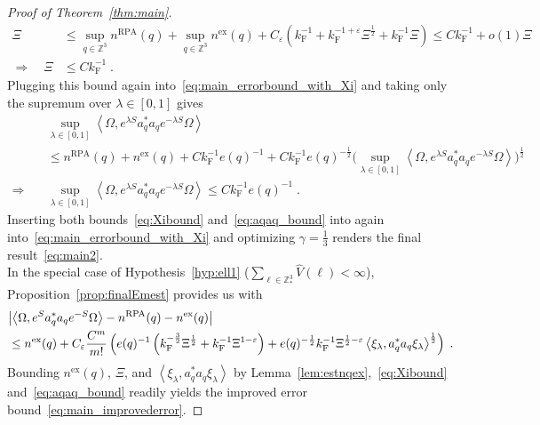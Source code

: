 \documentclass[12pt,a4paper]{article}
\numberwithin{equation}{section}
\newcommand{\1}{\mathbb{I}}
\newcommand{\ex}{\mathrm{ex}}
\newcommand{\F}{\mathrm{F}}
\newcommand{\RPA}{\mathrm{RPA}}
\newcommand{\Z}{\mathbb{Z}}
\newcommand{\half}{\frac{1}{2}}
\newcommand{\eva}[1]{\left\langle #1 \right\rangle}
\theoremstyle{plain}
\theoremstyle{definition}
\theoremstyle{remark}
\theoremstyle{plain}
\theoremstyle{definition}
\theoremstyle{remark}
\begin{document}
\begin{proof}[Proof of Theorem~\ref{thm:main}]
\begin{align} \label{eq:Xibound}
	\Xi
	&\le \sup_{q \in \Z^3} n^{\RPA}(q)
		+ \sup_{q \in \Z^3} n^{\ex}(q)
		+ C_\varepsilon \left( k_{\F}^{-1}
		+ k_{\F}^{-1 + \varepsilon} \Xi^\half
		+ k_{\F}^{-1} \Xi \right)
	\le C k_{\F}^{-1} + o(1) \Xi \nonumber\\
	\Rightarrow \quad
	\Xi
	& \le C k_{\F}^{-1} \;.
\end{align}
Plugging this bound again into~\eqref{eq:main_errorbound_with_Xi} and taking only the supremum over $ \lambda \in [0,1] $ gives
\begin{align} \label{eq:aqaq_bound}
	&\sup_{\lambda \in [0,1]} \eva{\Omega, e^{\lambda S} a_q^* a_q e^{-\lambda S} \Omega} \nonumber\\
	&\le n^{\RPA}(q) + n^{\ex}(q) + C k_{\F}^{-1} e(q)^{-1}
		+ C k_{\F}^{-1} e(q)^{-\half} \Big(\sup_{\lambda \in [0,1]} \eva{\Omega, e^{\lambda S} a_q^* a_q e^{-\lambda S} \Omega} \Big)^{\half} \nonumber\\
	\Rightarrow \quad
	&\sup_{\lambda \in [0,1]} \eva{\Omega, e^{\lambda S} a_q^* a_q e^{-\lambda S} \Omega}
	\le C k_{\F}^{-1} e(q)^{-1} \;.
\end{align}
Inserting both bounds~\eqref{eq:Xibound} and~\eqref{eq:aqaq_bound} into again into~\eqref{eq:main_errorbound_with_Xi} and optimizing $ \gamma = \frac 13 $ renders the final result~\eqref{eq:main2}.\\

In the special case of Hypothesis~\ref{hyp:ell1} ($ \sum_{\ell \in \Z^3_*} \hat{V}(\ell) < \infty $), Proposition~\ref{prop:finalEmest} provides us with
\begin{align} \label{eq:main_errorbound_with_Xi}
	& \abs{\eva{\Omega, e^{S} a_q^* a_q e^{-S} \Omega} - n^{\textnormal{RPA}}(q) - n^{\ex}(q)} \nonumber\\
	&\le n^{\ex}(q) + C_\varepsilon \frac{C^m}{m!}
		\left( e(q)^{-1} \left( k_{\F}^{-\frac{3}{2}} \Xi^\half
		+ k_{\F}^{-1} \Xi^{1-\varepsilon} \right)
		+ e(q)^{-\half} k_{\F}^{-1} \Xi^{\half - \varepsilon} \eva{\xi_\lambda, a_q^* a_q \xi_\lambda}^{\half}  \right) \;.
\end{align}
Bounding $ n^{\ex}(q) $, $ \Xi $, and $ \eva{\xi_\lambda, a_q^* a_q \xi_\lambda} $ by Lemma~\ref{lem:estnqex},~\eqref{eq:Xibound} and~\eqref{eq:aqaq_bound} readily yields the improved error bound~\eqref{eq:main_improvederror}.
\end{proof}
\end{document}
